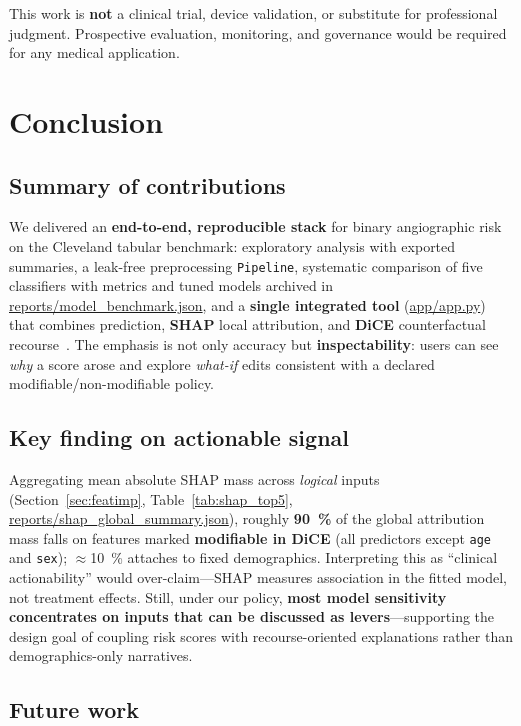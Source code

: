 \documentclass[11pt,a4paper]{article}
\begin{document}
This work is \textbf{not} a clinical trial, device validation, or substitute for professional judgment. Prospective evaluation, monitoring, and governance would be required for any medical application.

\section{Conclusion}
\label{sec:conclusion}

\subsection{Summary of contributions}

We delivered an \textbf{end-to-end, reproducible stack} for binary angiographic risk on the Cleveland tabular benchmark: exploratory analysis with exported summaries, a leak-free preprocessing \texttt{Pipeline}, systematic comparison of five classifiers with metrics and tuned models archived in \url{reports/model_benchmark.json}, and a \textbf{single integrated tool} (\url{app/app.py}) that combines prediction, \textbf{SHAP} local attribution, and \textbf{DiCE} counterfactual recourse~\cite{lundberg,dice,streamlit}. The emphasis is not only accuracy but \textbf{inspectability}: users can see \emph{why} a score arose and explore \emph{what-if} edits consistent with a declared modifiable/non-modifiable policy.

\subsection{Key finding on actionable signal}

Aggregating mean absolute SHAP mass across \emph{logical} inputs (Section~\ref{sec:featimp}, Table~\ref{tab:shap_top5}, \url{reports/shap_global_summary.json}), roughly \textbf{\SI{90}{\percent}} of the global attribution mass falls on features marked \textbf{modifiable in DiCE} (all predictors except \texttt{age} and \texttt{sex}); $\approx$\SI{10}{\percent} attaches to fixed demographics. Interpreting this as ``clinical actionability'' would over-claim—SHAP measures association in the fitted model, not treatment effects. Still, under our policy, \textbf{most model sensitivity concentrates on inputs that can be discussed as levers}—supporting the design goal of coupling risk scores with recourse-oriented explanations rather than demographics-only narratives.

\subsection{Future work}
\end{document}

